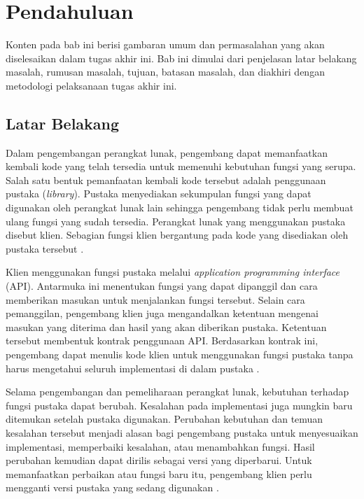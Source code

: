 
\chapter{Pendahuluan}
\label{chap:pendahuluan}

\begingroup
{}
\makeatletter
{}
\makeatother

Konten pada bab ini berisi gambaran umum dan permasalahan yang akan diselesaikan dalam tugas akhir ini. Bab ini dimulai dari penjelasan latar belakang masalah, rumusan masalah, tujuan, batasan masalah, dan diakhiri dengan metodologi pelaksanaan tugas akhir ini.

\section{Latar Belakang}
\label{sec:latar-belakang}

Dalam pengembangan perangkat lunak, pengembang dapat memanfaatkan kembali kode yang telah tersedia untuk memenuhi kebutuhan fungsi yang serupa. Salah satu bentuk pemanfaatan kembali kode tersebut adalah penggunaan pustaka (\textit{library}). Pustaka menyediakan sekumpulan fungsi yang dapat digunakan oleh perangkat lunak lain sehingga pengembang tidak perlu membuat ulang fungsi yang sudah tersedia. Perangkat lunak yang menggunakan pustaka disebut klien. Sebagian fungsi klien bergantung pada kode yang disediakan oleh pustaka tersebut \parencite{Ochoa2023}.

Klien menggunakan fungsi pustaka melalui \textit{application programming interface} (API). Antarmuka ini menentukan fungsi yang dapat dipanggil dan cara memberikan masukan untuk menjalankan fungsi tersebut. Selain cara pemanggilan, pengembang klien juga mengandalkan ketentuan mengenai masukan yang diterima dan hasil yang akan diberikan pustaka. Ketentuan tersebut membentuk kontrak penggunaan API\@. Berdasarkan kontrak ini, pengembang dapat menulis kode klien untuk menggunakan fungsi pustaka tanpa harus mengetahui seluruh implementasi di dalam pustaka \parencite{Ochoa2023,LiskovWing1994}.

Selama pengembangan dan pemeliharaan perangkat lunak, kebutuhan terhadap fungsi pustaka dapat berubah. Kesalahan pada implementasi juga mungkin baru ditemukan setelah pustaka digunakan. Perubahan kebutuhan dan temuan kesalahan tersebut menjadi alasan bagi pengembang pustaka untuk menyesuaikan implementasi, memperbaiki kesalahan, atau menambahkan fungsi. Hasil perubahan kemudian dapat dirilis sebagai versi yang diperbarui. Untuk memanfaatkan perbaikan atau fungsi baru itu, pengembang klien perlu mengganti versi pustaka yang sedang digunakan \parencite{Ochoa2023}.

